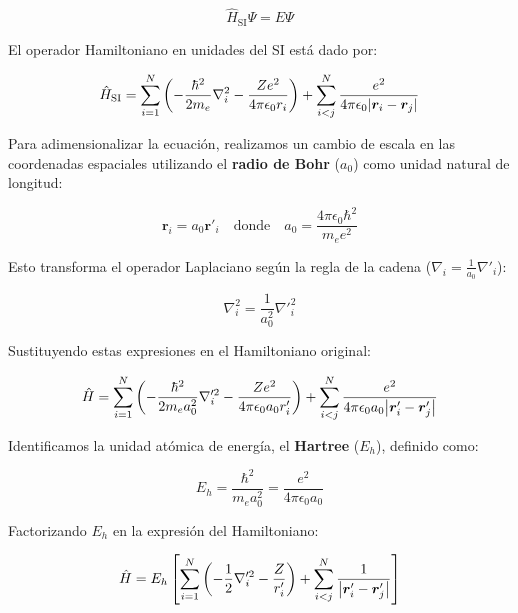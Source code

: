 \documentclass[12pt, a4paper, oneside, spanish]{book}
\begin{document}
\begin{equation}
    \hat{H}_{\text{SI}} \Psi = E \Psi
\end{equation}

El operador Hamiltoniano en unidades del SI está dado por:

\begin{equation}
    \hat{H}_{\text{SI}} = \sum_{i=1}^N \qty( -\frac{\hbar^2}{2m_e} \nabla_i^2 - \frac{Ze^2}{4\pi\epsilon_0 r_i} ) + \sum_{i<j}^N \frac{e^2}{4\pi\epsilon_0 \abs{\bm{r}_i - \bm{r}_j}}
\end{equation}

Para adimensionalizar la ecuación, realizamos un cambio de escala en las coordenadas espaciales utilizando el \textbf{radio de Bohr} ($a_0$) como unidad natural de longitud:

\begin{equation}
    \bm{r}_i = a_0 \bm{r}'_i \quad \text{donde} \quad a_0 = \frac{4\pi\epsilon_0 \hbar^2}{m_e e^2}
\end{equation}

Esto transforma el operador Laplaciano según la regla de la cadena ($\nabla_i = \frac{1}{a_0}\nabla'_i$):

\begin{equation}
    \nabla_i^2 = \frac{1}{a_0^2} \nabla'^2_i
\end{equation}

Sustituyendo estas expresiones en el Hamiltoniano original:

\begin{equation}
    \hat{H} = \sum_{i=1}^N \qty( -\frac{\hbar^2}{2m_e a_0^2} \nabla'^2_i - \frac{Ze^2}{4\pi\epsilon_0 a_0 r'_i} ) + \sum_{i<j}^N \frac{e^2}{4\pi\epsilon_0 a_0 \abs{\bm{r}'_i - \bm{r}'_j}}
\end{equation}

Identificamos la unidad atómica de energía, el \textbf{Hartree} ($E_h$), definido como:

\begin{equation}
    E_h = \frac{\hbar^2}{m_e a_0^2} = \frac{e^2}{4\pi\epsilon_0 a_0}
\end{equation}

Factorizando $E_h$ en la expresión del Hamiltoniano:

\begin{equation}
    \hat{H} = E_h \left[ \sum_{i=1}^N \qty( -\frac{1}{2} \nabla'^2_i - \frac{Z}{r'_i} ) + \sum_{i<j}^N \frac{1}{\abs{\bm{r}'_i - \bm{r}'_j}} \right]
\end{equation}
\end{document}
